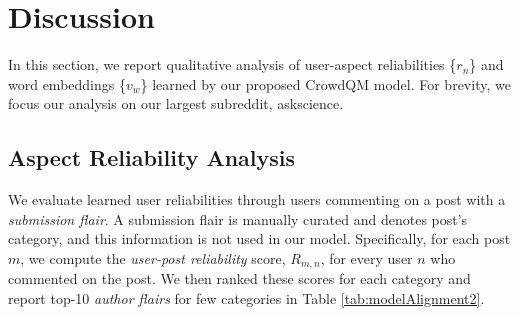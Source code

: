 \section{Discussion} \label{sec:discussion}
In this section, we report qualitative analysis of user-aspect reliabilities \{$r_n$\} and word embeddings \{$v_w$\} learned by our proposed CrowdQM model. For brevity, we focus our analysis on our largest subreddit, askscience.

\subsection{Aspect Reliability Analysis}
We evaluate learned user reliabilities through users commenting on a post with a \emph{submission flair}. A submission flair is manually curated and denotes post's category, and this information is not used in our model. Specifically, for each post $m$, we compute the \emph{user-post reliability} score, $R_{m,n}$, for every user $n$ who commented on the post. We then ranked these scores for each category and report top-10 \emph{author flairs} for few categories in Table \ref{tab:modelAlignment2}.

